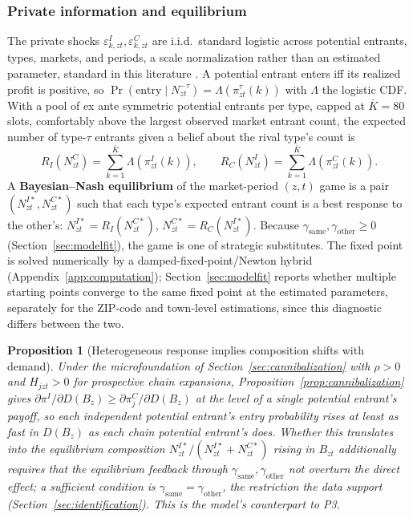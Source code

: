 \documentclass[english,12pt]{article}
\newtheorem{proposition}{Proposition}
\begin{document}
\subsubsection{Private information and equilibrium}
\label{sec:equilibrium}

The private shocks $\varepsilon^I_{k,zt}, \varepsilon^C_{k,zt}$ are i.i.d.\ standard logistic across potential entrants, types, markets, and periods, a scale normalization rather than an estimated parameter, standard in this literature \citep{Seim2006,TrainDCM}. A potential entrant enters iff its realized profit is positive, so $\Pr(\text{entry}\mid N^{-\tau}_{zt}) = \Lambda(\pi^\tau_{zt}(k))$ with $\Lambda$ the logistic CDF. With a pool of ex ante symmetric potential entrants per type, capped at $\bar K=80$ slots, comfortably above the largest observed market entrant count, the expected number of type-$\tau$ entrants given a belief about the rival type's count is
\[
R_I(N^C_{zt}) = \sum_{k=1}^{\bar K}\Lambda(\pi^I_{zt}(k)), \qquad R_C(N^I_{zt}) = \sum_{k=1}^{\bar K}\Lambda(\pi^C_{zt}(k)).
\]
A \textbf{Bayesian--Nash equilibrium} of the market-period $(z,t)$ game is a pair $(N^{I*}_{zt}, N^{C*}_{zt})$ such that each type's expected entrant count is a best response to the other's: $N^{I*}_{zt}=R_I(N^{C*}_{zt})$, $N^{C*}_{zt}=R_C(N^{I*}_{zt})$. Because $\gamma_{\text{same}},\gamma_{\text{other}}\ge0$ (Section~\ref{sec:modelfit}), the game is one of strategic substitutes. The fixed point is solved numerically by a damped-fixed-point/Newton hybrid (Appendix~\ref{app:computation}); Section~\ref{sec:modelfit} reports whether multiple starting points converge to the same fixed point at the estimated parameters, separately for the ZIP-code and town-level estimations, since this diagnostic differs between the two.

\begin{proposition}[Heterogeneous response implies composition shifts with demand]
\label{prop:2}
Under the microfoundation of Section~\ref{sec:cannibalization} with $\rho>0$ and $H_{jzt}>0$ for prospective chain expansions, Proposition~\ref{prop:cannibalization} gives $\partial\pi^I/\partial D(B_z)\ge\partial\pi^C_j/\partial D(B_z)$ at the level of a single potential entrant's payoff, so each independent potential entrant's entry probability rises at least as fast in $D(B_z)$ as each chain potential entrant's does. Whether this translates into the \emph{equilibrium} composition $N^{I*}_{zt}/(N^{I*}_{zt}+N^{C*}_{zt})$ rising in $B_{zt}$ additionally requires that the equilibrium feedback through $\gamma_{\text{same}},\gamma_{\text{other}}$ not overturn the direct effect; a sufficient condition is $\gamma_{\text{same}}=\gamma_{\text{other}}$, the restriction the data support (Section~\ref{sec:identification}). This is the model's counterpart to P3.
\end{proposition}
\end{document}
